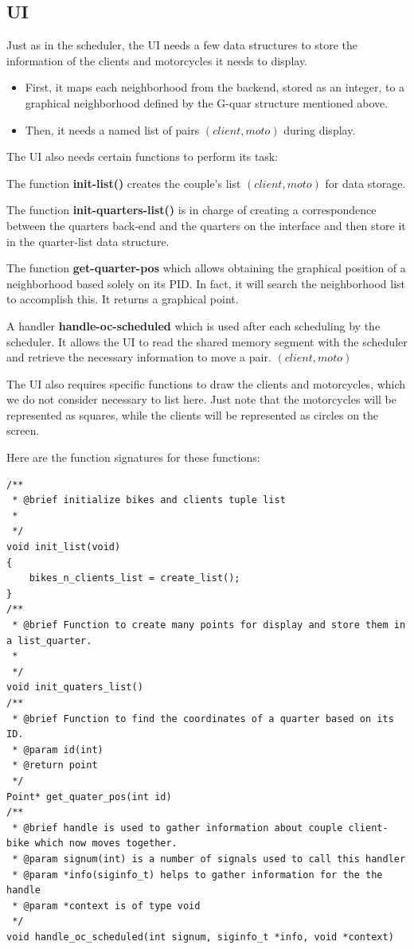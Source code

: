 \subsection{UI}
Just as in the scheduler, the UI needs a few data structures to store the information of the clients and motorcycles it needs to display.
\begin{itemize}
    
    \item First, it maps each neighborhood from the backend, stored as an integer, to a graphical neighborhood defined by the G-quar structure mentioned above.
    \item Then, it needs a named list of pairs  
    $(client,moto)$ during display.
\end{itemize}
The UI also needs certain functions to perform its task:
\begin{enumarate}
    \item The function \textbf{init-list()} creates the couple's list $(client,moto)$ for data storage.
    \item The function \textbf{init-quarters-list()} is in charge of creating a correspondence between the quarters back-end and the quarters on the interface and then store it in the quarter-list data structure.
    \item The function \textbf{get-quarter-pos} which allows obtaining the graphical position of a neighborhood based solely on its PID. In fact, it will search the neighborhood list to accomplish this. It returns a graphical point.
    \item A handler \textbf{handle-oc-scheduled} which is used after each scheduling by the scheduler. It allows the UI to read the shared memory segment with the scheduler and retrieve the necessary information to move a pair. $(client,moto)$
    \item The UI also requires specific functions to draw the clients and motorcycles, which we do not consider necessary to list here. Just note that the motorcycles will be represented as squares, while the clients will be represented as circles on the screen.
\end{enumarate}
Here are the function signatures for these functions:
\newpage
\begin{lstlisting}[style=customc, caption={functions of UI}]
/**
 * @brief initialize bikes and clients tuple list
 * 
 */
void init_list(void)
{
    bikes_n_clients_list = create_list();
}
/** 
 * @brief Function to create many points for display and store them in a list_quarter. 
 * 
 */
void init_quaters_list() 
/**
 * @brief Function to find the coordinates of a quarter based on its ID. 
 * @param id(int) 
 * @return point 
 */
Point* get_quater_pos(int id)
/**
 * @brief handle is used to gather information about couple client-bike which now moves together. 
 * @param signum(int) is a number of signals used to call this handler
 * @param *info(siginfo_t) helps to gather information for the the handle
 * @param *context is of type void 
 */
void handle_oc_scheduled(int signum, siginfo_t *info, void *context)

\end{lstlisting}